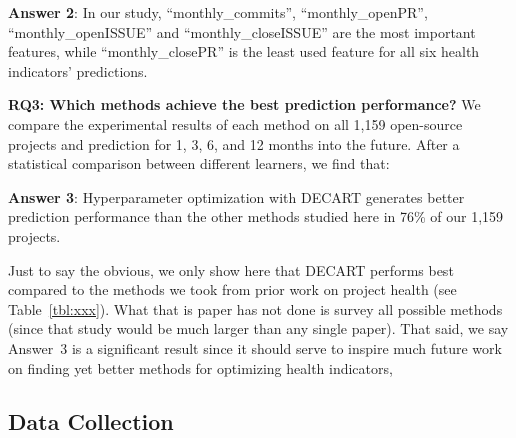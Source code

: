 \documentclass[smallextended]{svjour3}
\newcommand{\tbl}[1]{Table~\ref{tbl:#1}}
\newcommand{\respto}[1]{
\fcolorbox{black}{black!15}{%
\label{resp:#1}%
\bf\scriptsize R{#1}}}
\newcommand{\BLUE}{\color{blue}}
\newcommand{\BLACK}{\color{black}}
\begin{document}
\begin{blockquote}
\noindent
\textbf{Answer 2}: In our study, ``monthly\_commits'', ``monthly\_openPR'', ``monthly\_openISSUE'' and ``monthly\_closeISSUE'' are the most important features, while ``monthly\_closePR'' is the least used feature for all six health indicators' predictions.
\end{blockquote}



\textbf{RQ3: Which methods achieve the best prediction performance?}
We compare the experimental results of each method on all 1,159 open-source projects and prediction for 1, 3, 6, and 12 months into the future. After a statistical comparison between different learners, we find that:  

\begin{blockquote}
\noindent
\textbf{Answer 3}: Hyperparameter optimization with DECART generates better prediction performance than the other methods studied here  in 76\% of our 1,159 projects.
\end{blockquote}


 \respto{2G3} \BLUE Just to say the obvious, we only show here that DECART performs best
 compared to the methods we took from prior work on project health (see \tbl{xxx}).
 What that is paper has not done is survey all possible methods (since that study
 would be much larger than any single paper).  That said, we say Answer~3 is a significant result since it should serve to inspire   much future work on finding yet better methods
 for optimizing health indicators, 
 \BLACK

\subsection{Data Collection}
\label{sect:data_collect}
\end{document}
